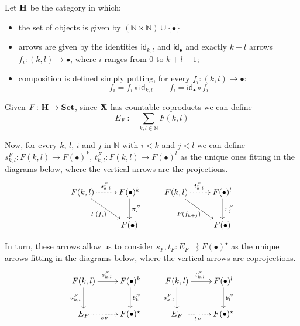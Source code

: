 \documentclass[runningheads,envcountsect]{llncs}
\def\X{\textbf {\textup{X}}}
\newcommand{\catname}[1]{\textbf{\textup{#1}}}
\newcommand{\id}[1]{\mathsf{id}_{#1}}
\begin{document}
\begin{definition}Let $\catname{H}$ be the category in which:
	\begin{itemize}
		\item the set of objects is given by $ (\mathbb{N}\times \mathbb{N}) \cup \{\bullet\}$
		\item arrows are given by the identities $\id{k,l}$ and $\id{\bullet}$ and exactly $k+l$ arrows $f_i\colon (k,l)\rightarrow \bullet$, where $i$ ranges from $0$ to $k+l-1$;
		\item composition is defined simply putting, for every $f_i\colon (k,l)\rightarrow \bullet$:
		\begin{equation*}
			f_i=f_i\circ \id{k,l} \qquad f_i = \id{\bullet}\circ f_i 
		\end{equation*}
	\end{itemize}
\end{definition}

Given $F\colon \catname{H}\to \catname{Set}$, since $\X$ has countable coproducts we can define
\[E_F:=\sum_{k,l\in \mathbb{N}}F(k,l)\]

Now, for every $k$, $l$, $i$ and $j$ in $\mathbb{N}$ with $i< k$ and $j< l$ we can define $s^F_{k,l}\colon F(k,l)\to F(\bullet)^k$,  $t^F_{k,l}\colon F(k,l)\to F(\bullet)^l$ as the unique ones fitting in the diagrams below, where the vertical arrows are the projections.
\[\xymatrix{F(k,l)  \ar@{.>}[r]^{s^F_{k,l}} \ar[dr]_{F(f_i)}& F(\bullet)^{k} \ar[d]^{\pi^F_{i}} & F(k,l) \ar@{.>}[r]^{t^F_{k,l}} \ar[dr]_{F(f_{k+j})} & F(\bullet)^{l} \ar[d]^{\pi^F_{j}} \\ & F(\bullet) && F(\bullet)}\]

In turn, these arrows allow us to consider
$s_F, t_F\colon E_F\rightrightarrows F(\bullet)^{\star}$ as the unique arrows fitting in the diagrams below, where the vertical arrows are coprojections.
\[\xymatrix{F(k,l) \ar[d]_{a^F_{k,l}}  \ar[r]^{s^{F}_{k,l}}& F(\bullet)^{k} \ar[d]^{b^F_{k}} & F(k,l) \ar[d]_{a^F_{k,l}}  \ar[r]^{t^{F}_{k,l}}& F(\bullet)^{l} \ar[d]^{b^F_{l}}\\ E_F \ar@{.>}[r]_-{s_F}& F(\bullet)^\star & E_F \ar@{.>}[r]_-{t_F}& F(\bullet)^\star}\]
\end{document}
